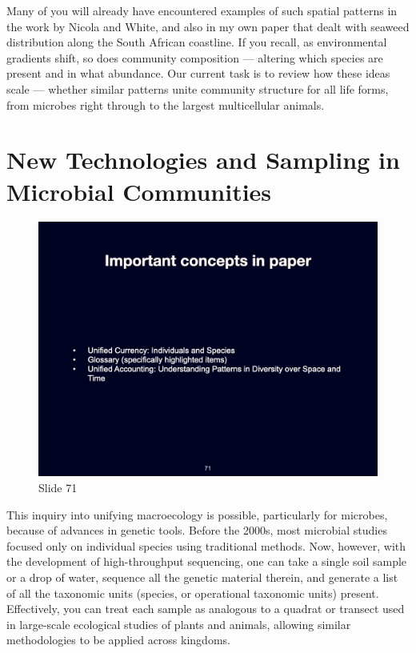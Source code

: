 \documentclass[
  10pt,
]{book}
\begin{document}
Many of you will already have encountered examples of such spatial
patterns in the work by Nicola and White, and also in my own paper that
dealt with seaweed distribution along the South African coastline. If
you recall, as environmental gradients shift, so does community
composition --- altering which species are present and in what
abundance. Our current task is to review how these ideas scale ---
whether similar patterns unite community structure for all life forms,
from microbes right through to the largest multicellular animals.

\section{New Technologies and Sampling in Microbial
Communities}\label{new-technologies-and-sampling-in-microbial-communities}

\begin{figure}[ht]
\centering
\includegraphics[width=0.8\linewidth]{../images/BDC334/BDC334-071.jpeg}
\caption*{Slide 71}
\end{figure}

This inquiry into unifying macroecology is possible, particularly for
microbes, because of advances in genetic tools. Before the 2000s, most
microbial studies focused only on individual species using traditional
methods. Now, however, with the development of high-throughput
sequencing, one can take a single soil sample or a drop of water,
sequence all the genetic material therein, and generate a list of all
the taxonomic units (species, or operational taxonomic units) present.
Effectively, you can treat each sample as analogous to a quadrat or
transect used in large-scale ecological studies of plants and animals,
allowing similar methodologies to be applied across kingdoms.
\end{document}
